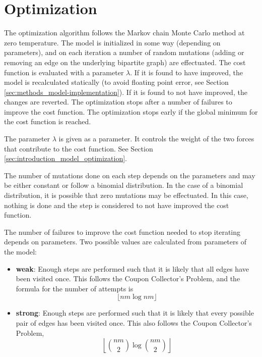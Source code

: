 \section{Optimization}
\label{sec:methods_optimization}

The optimization algorithm follows the Markov chain Monte Carlo method at zero temperature.
The model is initialized in some way (depending on parameters), and on each iteration a number of random mutations (adding or removing an edge on the underlying bipartite graph) are effectuated.
The cost function is evaluated with a parameter $\lambda$.
If it is found to have improved, the model is recalculated statically (to avoid floating point error, see Section \ref{sec:methods_model-implementation}).
If it is found to not have improved, the changes are reverted.
The optimization stops after a number of failures to improve the cost function.
The optimization stops early if the global minimum for the cost function is reached.

The parameter $\lambda$ is given as a parameter.
It controls the weight of the two forces that contribute to the cost function.
See Section \ref{sec:introduction_model_optimization}.

The number of mutations done on each step depends on the parameters and may be either constant or follow a binomial distribution.
In the case of a binomial distribution, it is possible that zero mutations may be effectuated.
In this case, nothing is done and the step is considered to not have improved the cost function.

The number of failures to improve the cost function needed to stop iterating depends on parameters.
Two possible values are calculated from parameters of the model:
\begin{itemize}
\item \textbf{weak}:
  Enough steps are performed such that it is likely that all edges have been visited once.
  This follows the Coupon Collector's Problem, and the formula for the number of attempts is
  \begin{equation*}
    \lfloor nm \log nm \rfloor
  \end{equation*}
\item \textbf{strong}:
  Enough steps are performed such that it is likely that every possible pair of edges has been visited once.
  This also follows the Coupon Collector's Problem,
  \begin{equation*}
    \left\lfloor {nm \choose 2} \log {nm \choose 2} \right\rfloor
  \end{equation*}
\end{itemize}

